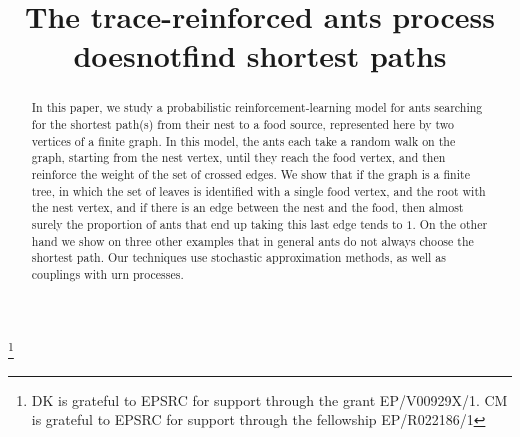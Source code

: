 \documentclass[JEP,XML,SOM,Unicode,NoFloatCountersInSection,published]{cedram}
\numberwithin{equation}{section}
\theoremstyle{definition}
\begin{document}
\frontmatter
\title{The trace-reinforced ants process does\nobreakspace not\nobreakspace find shortest paths}

\author[\initial{D.} \lastname{Kious}]{ }
\address{Department of Mathematical Sciences, University of Bath\\
Claverton Down, BA2 7AY Bath, UK.}

\author[\initial{C.} \lastname{Mailler}]{ }
\address{Department of Mathematical Sciences, University of Bath\\
Claverton Down, BA2 7AY Bath, UK.}

\author[\initial{B.} \lastname{Schapira}]{ }
\address{Aix-Marseille Université, CNRS, Centrale Marseille, I2M, UMR 7373\\
13453 Marseille, France}

\thanks{DK is grateful to EPSRC for support through the grant EP/V00929X/1. CM is grateful to EPSRC for support through the fellowship EP/R022186/1}

\begin{abstract}
In this paper, we study a probabilistic reinforcement-learning model for ants searching for the shortest path(s) from their nest to a food source, represented here by two vertices of a finite graph. In this model, the ants each take a random walk on the graph, starting from the nest vertex, until they reach the food vertex, and then reinforce the weight of the set of crossed edges. We show that if the graph is a finite tree, in which the set of leaves is identified with a single food vertex, and the root with the nest vertex, and if there is an edge between the nest and the food, then almost surely the proportion of ants that end up taking this last edge tends to $1$. On the other hand we show on three other examples that in general ants do not always choose the shortest path. Our techniques use stochastic approximation methods, as well as couplings with urn processes.
\end{abstract}


\end{document}
